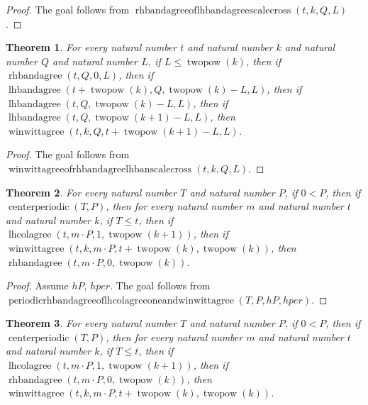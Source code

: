 \documentclass[11pt]{article}
\newtheorem{theorem}{Theorem}[section]
\theoremstyle{definition}
\begin{document}
\begin{proof}
The goal follows from \(\operatorname{rhbandagreeoflhbandagreescalecross}(t, k, Q, L)\).
\end{proof}
\begin{theorem}
\label{ll:paper:winwittagree-of-rhbandagree-lhbandagree-scale-cross}
For every natural number \(t\) and natural number \(k\) and natural number \(Q\) and natural number \(L\), if \(L \le \operatorname{twopow}(k)\), then if \(\operatorname{rhbandagree}(t, Q, 0, L)\), then if \(\operatorname{lhbandagree}(t + \operatorname{twopow}(k), Q, \operatorname{twopow}(k) - L, L)\), then if \(\operatorname{lhbandagree}(t, Q, \operatorname{twopow}(k) - L, L)\), then if \(\operatorname{lhbandagree}(t, Q, \operatorname{twopow}(k + 1) - L, L)\), then \(\operatorname{winwittagree}(t, k, Q, t + \operatorname{twopow}(k + 1) - L, L)\).
\end{theorem}
\begin{proof}
The goal follows from \(\operatorname{winwittagreeofrhbandagreelhbanscalecross}(t, k, Q, L)\).
\end{proof}
\begin{theorem}
\label{ll:paper:periodic-rhbandagree-of-lhcolagree-one-and-winwittagree}
For every natural number \(T\) and natural number \(P\), if \(0 < P\), then if \(\operatorname{centerperiodic}(T, P)\), then for every natural number \(m\) and natural number \(t\) and natural number \(k\), if \(T \le t\), then if \(\operatorname{lhcolagree}(t, m \cdot P, 1, \operatorname{twopow}(k + 1))\), then if \(\operatorname{winwittagree}(t, k, m \cdot P, t + \operatorname{twopow}(k), \operatorname{twopow}(k))\), then \(\operatorname{rhbandagree}(t, m \cdot P, 0, \operatorname{twopow}(k))\).
\end{theorem}
\begin{proof}
Assume \(hP\), \(hper\).
The goal follows from \(\operatorname{periodicrhbandagreeoflhcolagreeoneandwinwittagree}(T, P, hP, hper)\).
\end{proof}
\begin{theorem}
\label{ll:paper:periodic-winwittagree-of-lhcolagree-one-and-rhbandagree}
For every natural number \(T\) and natural number \(P\), if \(0 < P\), then if \(\operatorname{centerperiodic}(T, P)\), then for every natural number \(m\) and natural number \(t\) and natural number \(k\), if \(T \le t\), then if \(\operatorname{lhcolagree}(t, m \cdot P, 1, \operatorname{twopow}(k + 1))\), then if \(\operatorname{rhbandagree}(t, m \cdot P, 0, \operatorname{twopow}(k))\), then \(\operatorname{winwittagree}(t, k, m \cdot P, t + \operatorname{twopow}(k), \operatorname{twopow}(k))\).
\end{theorem}
\end{document}
